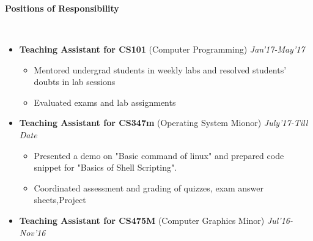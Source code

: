 \documentclass[a4paper,10pt]{article}
\newcommand{\lsep}{-0.5cm}
\newcommand{\resheading}[1]{{\small \colorbox{mygrey}{\begin{minipage}{0.975\textwidth}{\textbf{#1 \vphantom{p\^{E}}}}\end{minipage}}}}
\begin{document}
\hspace{0.5cm}\\
\hspace{0.5cm}\\
\hspace{0.5cm}\\
\hspace{0.5cm}\\
\hspace{0.5cm}\\
\hspace{0.5cm}\\
\hspace{0.5cm}\\
\hspace{0.5cm}\\
\hspace{0.5cm}\\
\hspace{0.5cm}\\
\hspace{0.5cm}\\
\hspace{0.5cm}\\
\hspace{0.5cm}\\
\hspace{0.5cm}\\
\hspace{0.5cm}\\[-0.2cm]


\resheading{\textbf{\large Positions of Responsibility} }\\[\lsep]
\begin{itemize}
  

	\item \textbf{Teaching Assistant for CS101} (Computer Programming) \emph{Jan'17-May'17}\\[-0.6cm]
	\begin{itemize}
    \item Mentored  undergrad students in weekly labs and resolved students’ doubts in lab sessions\\[-0.5cm]
    \item Evaluated exams and lab assignments\\[-0.5cm]
	\end{itemize}
\item \textbf{Teaching Assistant for CS347m} (Operating System Mionor) \emph{July'17-Till Date}\\[-0.6cm]
	\begin{itemize}
		\item Presented a demo on "Basic command  of linux"  and prepared code snippet for "Basics of Shell Scripting".\\[-0.5cm]
	    \item Coordinated assessment and grading of quizzes, exam answer sheets,Project	
	\end{itemize}

\item \textbf{Teaching Assistant for CS475M} (Computer Graphics Minor) \emph{Jul'16-Nov'16}\\[-0.6cm]
\end{itemize}
\vskip 0.15in
\end{document}
